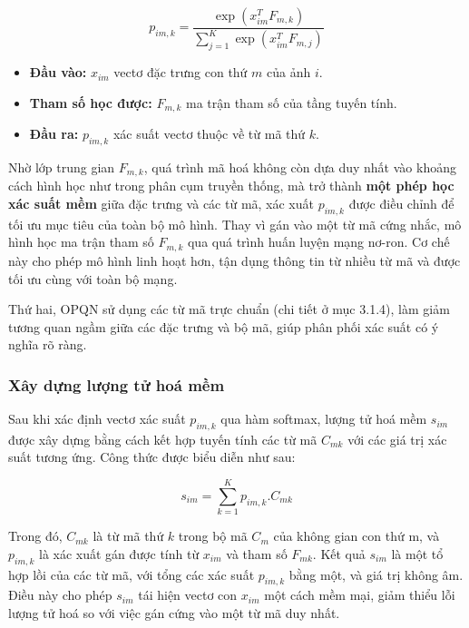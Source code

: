 \begin{equation}
p_{im,k} = \frac{\exp\!\left(x_{im}^{T} F_{m,k}\right)}
{\sum_{j=1}^{K} \exp\!\left(x_{im}^{T} F_{m,j}\right)}
\end{equation}


\begin{itemize}
    \item \textbf{Đầu vào:} $x_{im}$ vectơ đặc trưng con thứ $m$ của ảnh $i$.
    \item \textbf{Tham số học được:} $F_{m,k}$ ma trận tham số của tầng tuyến tính.
    \item \textbf{Đầu ra:} $p_{im,k}$ xác suất vectơ thuộc về từ mã thứ $k$.
\end{itemize}

Nhờ lớp trung gian $F_{m,k}$, quá trình mã hoá không còn dựa duy nhất vào khoảng cách hình học như trong phân cụm truyền thống, mà trở thành \textbf{một phép học xác suất mềm} giữa đặc trưng và các từ mã, xác xuất $p_{im,k}$ được điều chỉnh để tối ưu mục tiêu của toàn bộ mô hình. Thay vì gán vào một từ mã cứng nhắc, mô hình học ma trận tham số $F_{m,k}$ qua quá trình huấn luyện mạng nơ-ron. Cơ chế này cho phép mô hình linh hoạt hơn, tận dụng thông tin từ nhiều từ mã và được tối ưu cùng với toàn bộ mạng.

Thứ hai, OPQN sử dụng các từ mã trực chuẩn (chi tiết ở mục 3.1.4), làm giảm tương quan ngầm giữa các đặc trưng và bộ mã, giúp phân phối xác suất có ý nghĩa rõ ràng.

\subsubsection{Xây dựng lượng tử hoá mềm}
Sau khi xác định vectơ xác suất $p_{im,k}$ qua hàm softmax, lượng tử hoá mềm $s_{im}$ được xây dựng bằng cách kết hợp tuyến tính các từ mã $C_{mk}$ với các giá trị xác suất tương ứng. Công thức được biểu diễn như sau:

\begin{equation}
s_{im} = \sum_{k=1}^K p_{im,k} . C_{mk}
\end{equation}

Trong đó, $C_{mk}$ là từ mã thứ $k$ trong bộ mã $C_m$ của không gian con thứ m, và $p_{im,k}$ là xác xuất gán được tính từ $x_{im}$ và tham số $F_{mk}$. Kết quả $s_{im}$ là một tổ hợp lồi của các từ mã, với tổng các xác suất $p_{im,k}$ bằng một, và giá trị không âm. Điều này cho phép $s_{im}$ tái hiện vectơ con $x_{im}$ một cách mềm mại, giảm thiểu lỗi lượng tử hoá so với việc gán cứng vào một từ mã duy nhất.

